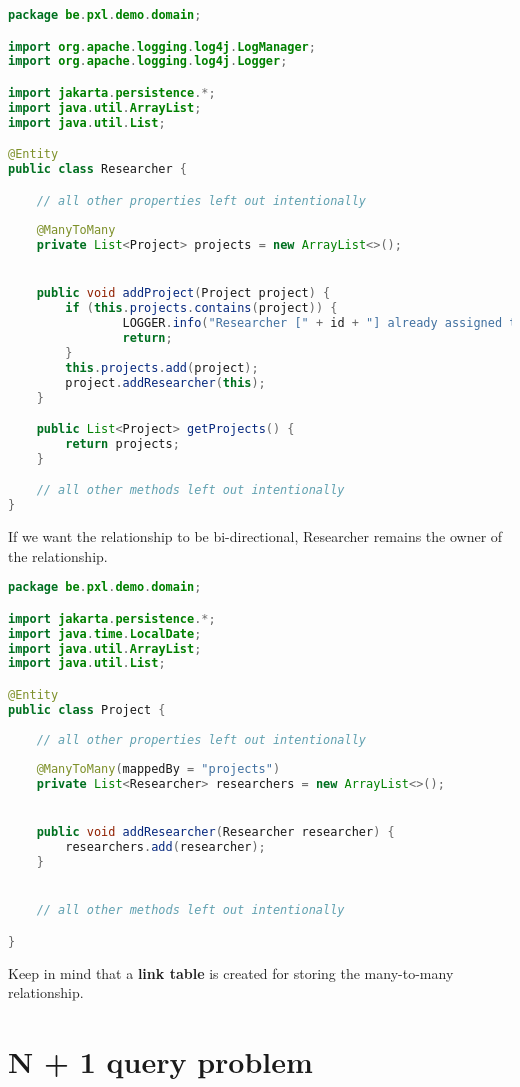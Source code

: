 \begin{lstlisting}[frame=single,language=java]
package be.pxl.demo.domain;

import org.apache.logging.log4j.LogManager;
import org.apache.logging.log4j.Logger;

import jakarta.persistence.*;
import java.util.ArrayList;
import java.util.List;

@Entity
public class Researcher {

	// all other properties left out intentionally
	
	@ManyToMany
	private List<Project> projects = new ArrayList<>();


	public void addProject(Project project) {
		if (this.projects.contains(project)) {
				LOGGER.info("Researcher [" + id + "] already assigned to [" + project.getName() + "]");
				return;
		}
		this.projects.add(project);
		project.addResearcher(this);
	}

	public List<Project> getProjects() {
		return projects;
	}

	// all other methods left out intentionally
}
\end{lstlisting}


If we want the relationship to be bi-directional, Researcher remains the owner of the relationship.  

\begin{lstlisting}[frame=single,language=java]
package be.pxl.demo.domain;

import jakarta.persistence.*;
import java.time.LocalDate;
import java.util.ArrayList;
import java.util.List;

@Entity
public class Project {
	
	// all other properties left out intentionally
	
	@ManyToMany(mappedBy = "projects")
	private List<Researcher> researchers = new ArrayList<>();


	public void addResearcher(Researcher researcher) {
		researchers.add(researcher);
	}


	// all other methods left out intentionally

}
\end{lstlisting}


Keep in mind that a \textbf{link table} is created for storing the many-to-many relationship.



\section{N + 1 query problem}

